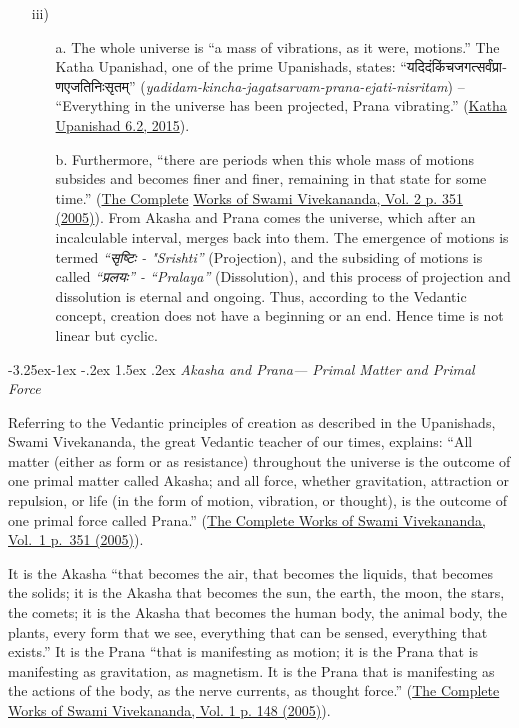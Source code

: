 \documentclass[twoside, 13pt]{article}
\makeatletter
\renewcommand\subsubsection{\@startsection{subsubsection}{3}{\z@}%
                                     {-3.25ex\@plus -1ex \@minus -.2ex}%
                                     {1.5ex \@plus .2ex}%
                                     {\normalfont\large\bfseries}}
\makeatother
\begin{document}
{{\begin{itemize}
\item[iii)]\begin{itemize}
\item[a.] The whole universe is “a mass of vibrations, as it were, motions.” The Katha Upanishad, one of the prime Upanishads, states: \foreignlanguage{hindi}{{\fontsize{9}{11}\selectfont “यदिदंकिंचजगत्सर्वंप्राणएजतिनिःसृतम्”}} (\textit{yadidam-kincha-jagatsarvam-prana-ejati-nisritam}) – “Everything in the universe has been projected, Prana vibrating.” (\underline{Katha Upanishad 6.2, 2015}).


\item[b.] Furthermore, “there are periods when this whole mass of motions subsides and becomes finer and finer, remaining in that state for some time.” (\underline{The Complete} \underline{Works of Swami Vivekananda, Vol. 2 p. 351 (2005)}). From Akasha and Prana comes the universe, which after an incalculable interval, merges back into them. The emergence of motions is termed \textit{\foreignlanguage{hindi}{{\fontsize{9}{11}\selectfont “सृष्टिः}} - "Srishti”} (Projection), and the subsiding of motions is called \textit{\foreignlanguage{hindi}{{\fontsize{9}{11}\selectfont “प्रलयः”}} - “Pralaya”} (Dissolution), and this process of projection and dissolution is eternal and ongoing. Thus, according to the Vedantic concept, creation does not have a beginning or an end. Hence time is not linear but cyclic. 
\end{itemize}

\end{itemize}}

{\fontsize{8}{10}\selectfont
\subsubsection{\textit{Akasha and Prana— Primal Matter and Primal Force}}}\label{subsubsec-2.1.1}

{\fontsize{12}{14}\selectfont Referring to the Vedantic principles of creation as described in the Upanishads, Swami Vivekananda, the great Vedantic teacher of our times, explains: “All matter (either as form or as resistance) throughout the universe is the outcome of one primal matter called Akasha; and all force, whether gravitation, attraction or repulsion, or life (in the form of motion, vibration, or thought), is the outcome of one primal force called Prana.” (\underline{The Complete Works of Swami Vivekananda, Vol.~1 p.~351 (2005)}).

It is the Akasha “that becomes the air, that becomes the liquids, that becomes the solids; it is the Akasha that becomes the sun, the earth, the moon, the stars, the comets; it is the Akasha that becomes the human body, the animal body, the plants, every form that we see, everything that can be sensed, everything that exists.” It is the Prana “that is manifesting as motion; it is the Prana that is manifesting as gravitation, as magnetism. It is the Prana that is manifesting as the actions of the body, as the nerve currents, as thought force.” (\underline{The Complete Works of Swami Vivekananda, Vol. 1 p. 148 (2005)}).

}}
\end{document}
